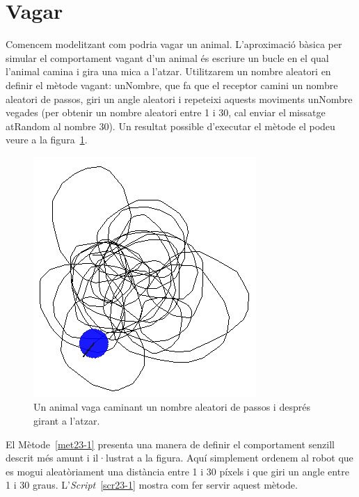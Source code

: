 \section{Vagar}
Comencem modelitzant com podria vagar un animal. L'aproximació bàsica per simular el comportament vagant d'un animal és escriure un bucle en el qual l'animal camina i gira una mica a l'atzar. Utilitzarem un nombre aleatori en definir el mètode \textsf{vagant: unNombre}, que fa que el receptor camini un nombre aleatori de passos, giri un angle aleatori i repeteixi aquests moviments \textsf{unNombre} vegades (per obtenir un nombre aleatori entre 1 i 30, cal enviar el missatge \textsf{atRandom} al nombre \textsf{30}). Un resultat possible d'executar el mètode el podeu veure a la figura~\ref{fig2301}.
\begin{figure}[h!]
\begin{center}
\includegraphics[scale=0.5]{Imatges/figura23-1}
\end{center}
\caption{Un animal vaga caminant un nombre aleatori de passos i després girant a l'atzar.}
\label{fig2301}
\end{figure}

El Mètode~\ref{met23-1} presenta una manera de definir el comportament senzill descrit més amunt i il·lustrat a la figura. Aquí simplement ordenem al robot que es mogui aleatòriament una distància entre 1 i 30 píxels i que giri un angle entre 1 i 30 graus. L'\emph{Script}~\ref{scr23-1} mostra com fer servir aquest mètode.


